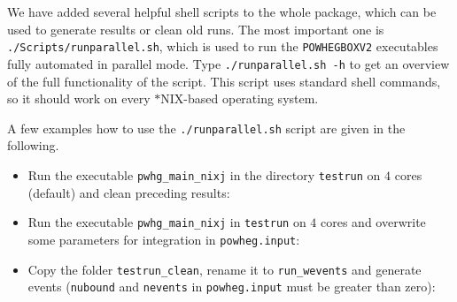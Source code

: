 \documentclass[a4paper,11pt]{article}
\newcommand\POWHEGBOXvTWO{{\tt POWHEG\;BOX\;V2}}
\begin{document}
We have added several helpful shell scripts to the whole package, which can be used to generate results or clean old runs. The most important one is {\tt ./Scripts/runparallel.sh}, which is used to run the \POWHEGBOXvTWO{} executables fully automated in parallel mode. Type {\tt ./runparallel.sh -h} to get an overview of the full functionality of the script. This script uses standard shell commands, so it should work on every $\ast$NIX-based operating system.

A few examples how to use the {\tt ./runparallel.sh} script are given in the following.
\begin{itemize}
\item Run the executable {\tt pwhg\_main\_nixj} in the directory {\tt testrun} on $4$ cores (default) and clean preceding results:
\\[2ex]
\hspace*{2cm}{\tt \$ ./runparallel.sh -c -d testrun -e pwhg\_main\_nixj}

\item Run the executable {\tt pwhg\_main\_nixj} in {\tt testrun} on $4$ cores and overwrite some parameters for integration in {\tt powheg.input}:
\\[2ex]

\item Copy the folder {\tt testrun\_clean}, rename it to {\tt run\_wevents} and generate events ({\tt nubound} and {\tt nevents} in {\tt powheg.input} must be greater than zero):
\\[2ex]


\end{itemize}
\end{document}
